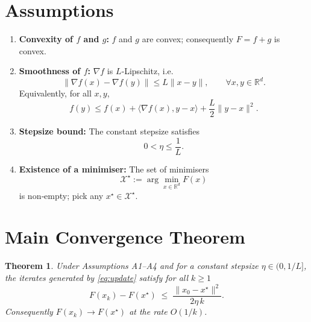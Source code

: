 \documentclass{article}
\newtheorem{theorem}{Theorem}
\begin{document}
\newpage

\section*{Assumptions}
\begin{enumerate}[label=\textbf{A\arabic*:}, leftmargin=*]
\item \textbf{Convexity of $f$ and $g$:} $f$ and $g$ are convex; consequently $F=f+g$ is convex.
\item \textbf{Smoothness of $f$:} $\nabla f$ is $L$‑Lipschitz, i.e.
\[
\|\nabla f(x)-\nabla f(y)\|\le L\|x-y\|,\qquad\forall x,y\in\mathbb{R}^d.
\tag{A2}
\]
Equivalently, for all $x,y$,
\[
f(y)\le f(x)+\langle \nabla f(x),y-x\rangle+\frac{L}{2}\|y-x\|^2.
\tag{A2'}
\]
\item \textbf{Stepsize bound:} The constant stepsize satisfies
\[
0<\eta\le \frac{1}{L}.
\tag{A3}
\]
\item \textbf{Existence of a minimiser:} The set of minimisers
\[
\mathcal{X}^\star :=\arg\min_{x\in\mathbb{R}^d}F(x)
\]
is non‑empty; pick any $x^\star\in\mathcal{X}^\star$.
\end{enumerate}

\section*{Main Convergence Theorem}
\begin{theorem}\label{thm:rate}
Under Assumptions A1–A4 and for a constant stepsize $\eta\in(0,1/L]$, the iterates generated by \eqref{eq:update} satisfy for all $k\ge 1$
\begin{equation}\label{eq:gap}
F(x_k)-F(x^\star)\;\le\;\frac{\|x_0-x^\star\|^2}{2\eta\,k}.
\end{equation}
Consequently $F(x_k)\to F(x^\star)$ at the rate $O(1/k)$.
\end{theorem}
\end{document}
